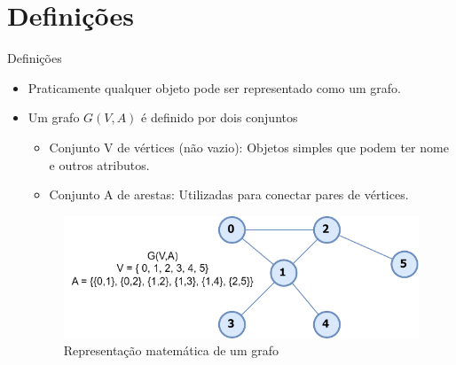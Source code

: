 \documentclass{if-beamer}
\begin{document}
\section{Definições}

\begin{frame}{Definições} 
\begin{itemize}
\justifying
\item Praticamente qualquer objeto pode ser representado como um grafo.
\item Um grafo $G(V,A)$ é definido por dois conjuntos 
\begin{itemize}
\vspace{0.3cm}
\item Conjunto V de vértices (não vazio): Objetos simples que podem ter nome e outros atributos.
\vspace{0.3cm}
\item Conjunto A de arestas: Utilizadas para conectar pares de vértices.
\end{itemize} 
\begin{figure}
  \centering
  \includegraphics[scale=0.80]{Figuras/exemplos-grafo/e_svg-tex.pdf}
  \caption{Representação matemática de um grafo}
\end{figure}

\end{itemize} 
\end{frame}
\end{document}
